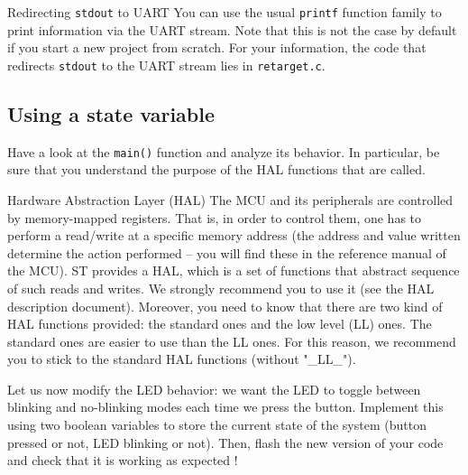 

\begin{bclogo}[couleur = gray!20, arrondi = 0.2, logo=\bcinfo]{Redirecting \texttt{stdout} to UART}
You can use the usual \texttt{printf} function family to print information via the UART stream. Note that this is not the case by default if you start a new project from scratch. For your information, the code that redirects \texttt{stdout} to the UART stream lies in \texttt{retarget.c}.
\end{bclogo}


\subsection{Using a state variable}

Have a look at the \texttt{main()} function and analyze its behavior. In particular, be sure that you understand the purpose of the HAL functions that are called.

\begin{bclogo}[couleur = gray!20, arrondi = 0.2, logo=\bcinfo]{Hardware Abstraction Layer (HAL)}
The MCU and its peripherals are controlled by memory-mapped registers. That is, in order to control them, one has to perform a read/write at a specific memory address (the address and value written determine the action performed -- you will find these in the reference manual of the MCU).
ST provides a HAL, which is a set of functions that abstract sequence of such reads and writes. We strongly recommend you to use it (see the HAL description document). Moreover, you need to know that there are two kind of HAL functions provided: the standard ones and the low level (LL) ones. The standard ones are easier to use than the LL ones. For this reason, we recommend you to stick to the standard HAL functions (without "\_LL\_").
\end{bclogo}

Let us now modify the LED behavior: we want the LED to toggle between blinking and no-blinking modes each time we press the button. Implement this using two boolean variables to store the current state of the system (button pressed or not, LED blinking or not). Then, flash the new version of your code and check that it is working as expected !

